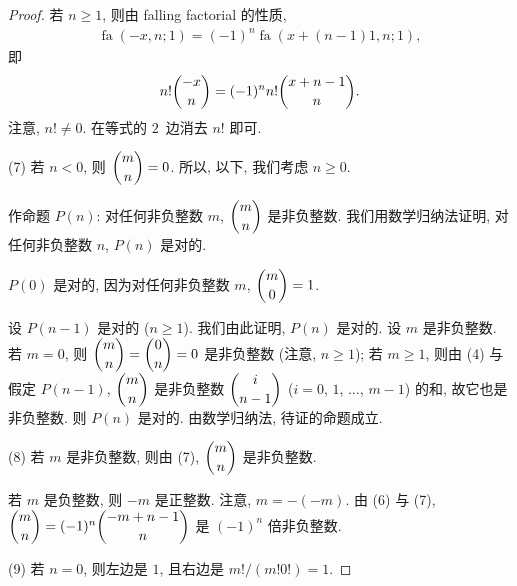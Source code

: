 \documentclass[../libro.tex]{subfiles}
\begin{document}
\begin{proof}
    若 \(n \geq 1\), 则由 falling factorial 的性质,
    \begin{align*}
        \operatorname{fa} {(-x, n; 1)}
        = (-1)^n \operatorname{fa} {(x + (n-1) 1, n; 1)},
    \end{align*}
    即
    \begin{align*}
        n! \dbinom{-x}{n}
        = (-1)^n n! \dbinom{x + n - 1}{n}.
    \end{align*}
    注意, \(n! \neq 0\).
    在等式的 \(2\)~边消去 \(n!\) 即可.

    (7)
    若 \(n < 0\), 则 \(\dbinom{m}{n} = 0\).
    所以, 以下, 我们考虑 \(n \geq 0\).

    作命题 \(P(n)\):
    对任何非负整数 \(m\),
    \(\dbinom{m}{n}\) 是非负整数.
    我们用数学归纳法证明, 对任何非负整数 \(n\),
    \(P(n)\) 是对的.

    \(P(0)\) 是对的, 因为对任何非负整数 \(m\),
    \(\dbinom{m}{0} = 1\).

    设 \(P(n-1)\) 是对的 (\(n \geq 1\)).
    我们由此证明, \(P(n)\) 是对的.
    设 \(m\) 是非负整数.
    若 \(m = 0\),
    则 \(\dbinom{m}{n} = \dbinom{0}{n} = 0\) 是非负整数
    (注意, \(n \geq 1\));
    若 \(m \geq 1\), 则由 (4) 与假定 \(P(n-1)\),
    \(\dbinom{m}{n}\) 是非负整数 \(\dbinom{i}{n-1}\)
    (\(i = 0\), \(1\), \(\dots\), \(m-1\))
    的和, 故它也是非负整数.
    则 \(P(n)\) 是对的.
    由数学归纳法, 待证的命题成立.

    (8)
    若 \(m\) 是非负整数, 则由 (7),
    \(\dbinom{m}{n}\) 是非负整数.

    若 \(m\) 是负整数, 则 \(-m\) 是正整数.
    注意, \(m = -(-m)\).
    由 (6) 与 (7),
    \(\dbinom{m}{n} = (-1)^n \dbinom{-m + n - 1}{n}\)
    是 \((-1)^n\) 倍非负整数.

    (9)
    若 \(n = 0\), 则左边是 \(1\), 且右边是 \(m!/(m! 0!) = 1\).


\end{proof}
\end{document}
